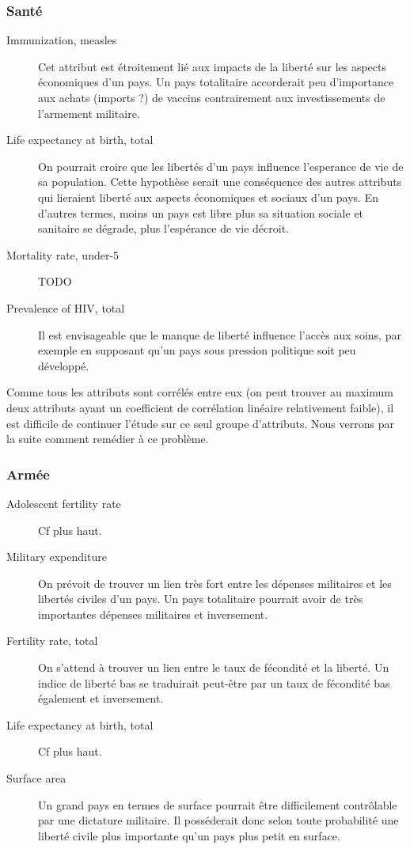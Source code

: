 \subsubsection{Santé}
\begin{description}
\item [Immunization, measles]
Cet attribut est étroitement lié aux impacts de la liberté sur les aspects économiques d'un pays. Un pays totalitaire
accorderait peu d'importance aux achats (imports ?) de vaccins contrairement aux investissements de l'armement militaire.
\item [Life expectancy at birth, total]
On pourrait croire que les libertés d'un pays influence l'esperance de vie de sa population. Cette hypothèse serait une conséquence
des autres attributs qui lieraient liberté aux aspects économiques et sociaux d'un pays. En d'autres termes, moins un pays est libre plus sa situation sociale et sanitaire se dégrade, plus l'espérance de vie décroit.
\item [Mortality rate, under-5]
{\huge TODO}
\item [Prevalence of HIV, total]
Il est envisageable que le manque de liberté influence l'accès aux soins, par exemple en supposant qu'un pays sous pression politique soit peu développé.
\end{description}

Comme tous les attributs sont corrélés entre eux (on peut trouver au maximum deux attributs ayant un coefficient de corrélation linéaire relativement faible), il est difficile de continuer l'étude sur ce seul groupe d'attributs. Nous verrons par la suite comment remédier à ce problème.

\subsubsection{Armée}
\begin{description}
\item [Adolescent fertility rate]
Cf plus haut.
\item [Military expenditure]
On prévoit de trouver un lien très fort entre les dépenses militaires et les libertés civiles d'un pays. Un pays totalitaire pourrait avoir de très importantes dépenses militaires et inversement.
\item [Fertility rate, total]
On s'attend à trouver un lien entre le taux de fécondité et la liberté. Un indice de liberté bas se traduirait peut-être par un taux de fécondité bas également et inversement.
\item [Life expectancy at birth, total]
Cf plus haut.
\item [Surface area]
Un grand pays en termes de surface pourrait être difficilement contrôlable par une dictature militaire. Il posséderait donc selon toute probabilité une liberté civile plus importante qu'un pays plus petit en surface.
\end{description}

